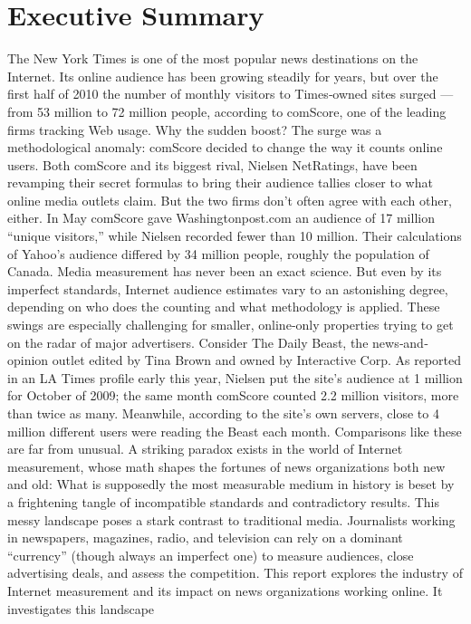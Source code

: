 \chapter{Executive Summary}
The New York Times is one of the most popular news destinations on the
Internet. Its online audience has been growing steadily for years, but over
the first half of 2010 the number of monthly visitors to Times‐owned sites
surged — from 53 million to 72 million people, according to comScore,
one of the leading firms tracking Web usage.
Why the sudden boost? The surge was a methodological anomaly:
comScore decided to change the way it counts online users. Both
comScore and its biggest rival, Nielsen NetRatings, have been revamping
their secret formulas to bring their audience tallies closer to what online
media outlets claim. But the two firms don’t often agree with each other,
either. In May comScore gave Washingtonpost.com an audience of 17
million ``unique visitors,'' while Nielsen recorded fewer than 10 million.
Their calculations of Yahoo’s audience differed by 34 million people,
roughly the population of Canada.
Media measurement has never been an exact science. But even by its
imperfect standards, Internet audience estimates vary to an astonishing
degree, depending on who does the counting and what methodology is
applied. These swings are especially challenging for smaller, online‐only
properties trying to get on the radar of major advertisers.
Consider The Daily Beast, the news‐and‐opinion outlet edited by Tina
Brown and owned by Interactive Corp. As reported in an LA Times profile
early this year, Nielsen put the site’s audience at 1 million for October of
2009; the same month comScore counted 2.2 million visitors, more than
twice as many. Meanwhile, according to the site’s own servers, close to 4
million different users were reading the Beast each month.
Comparisons like these are far from unusual. A striking paradox exists in
the world of Internet measurement, whose math shapes the fortunes of
news organizations both new and old: What is supposedly the most
measurable medium in history is beset by a frightening tangle of
incompatible standards and contradictory results.
This messy landscape poses a stark contrast to traditional media.
Journalists working in newspapers, magazines, radio, and television can
rely on a dominant ``currency'' (though always an imperfect one) to
measure audiences, close advertising deals, and assess the competition.
This report explores the industry of Internet measurement and its impact
on news organizations working online. It investigates this landscape
